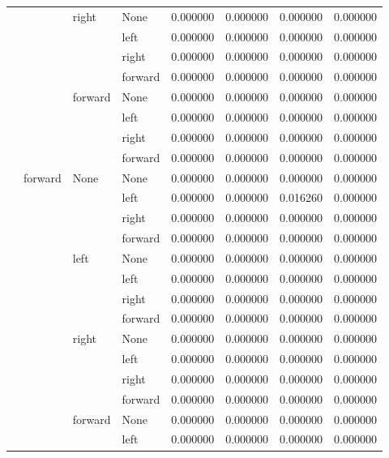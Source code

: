 \documentclass{article}
\begin{document}
\begin{longtable}{llllrrrr}
      &      & right & None &  0.000000 &  0.000000 &  0.000000 &  0.000000 \\
      &      &      & left &  0.000000 &  0.000000 &  0.000000 &  0.000000 \\
      &      &      & right &  0.000000 &  0.000000 &  0.000000 &  0.000000 \\
      &      &      & forward &  0.000000 &  0.000000 &  0.000000 &  0.000000 \\
      &      & forward & None &  0.000000 &  0.000000 &  0.000000 &  0.000000 \\
      &      &      & left &  0.000000 &  0.000000 &  0.000000 &  0.000000 \\
      &      &      & right &  0.000000 &  0.000000 &  0.000000 &  0.000000 \\
      &      &      & forward &  0.000000 &  0.000000 &  0.000000 &  0.000000 \\
      & forward & None & None &  0.000000 &  0.000000 &  0.000000 &  0.000000 \\
      &      &      & left &  0.000000 &  0.000000 &  0.016260 &  0.000000 \\
      &      &      & right &  0.000000 &  0.000000 &  0.000000 &  0.000000 \\
      &      &      & forward &  0.000000 &  0.000000 &  0.000000 &  0.000000 \\
      &      & left & None &  0.000000 &  0.000000 &  0.000000 &  0.000000 \\
      &      &      & left &  0.000000 &  0.000000 &  0.000000 &  0.000000 \\
      &      &      & right &  0.000000 &  0.000000 &  0.000000 &  0.000000 \\
      &      &      & forward &  0.000000 &  0.000000 &  0.000000 &  0.000000 \\
      &      & right & None &  0.000000 &  0.000000 &  0.000000 &  0.000000 \\
      &      &      & left &  0.000000 &  0.000000 &  0.000000 &  0.000000 \\
      &      &      & right &  0.000000 &  0.000000 &  0.000000 &  0.000000 \\
      &      &      & forward &  0.000000 &  0.000000 &  0.000000 &  0.000000 \\
      &      & forward & None &  0.000000 &  0.000000 &  0.000000 &  0.000000 \\
      &      &      & left &  0.000000 &  0.000000 &  0.000000 &  0.000000 \\

\end{longtable}
\end{document}
